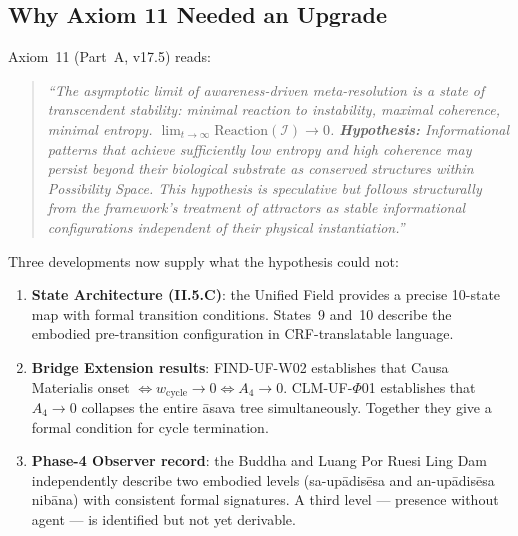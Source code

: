 \documentclass[12pt, a4paper]{article}
\providecommand{\wcyc}{w_{\mathrm{cycle}}}
\begin{document}
\subsection{Why Axiom 11 Needed an Upgrade}


Axiom~11 (Part~A, v17.5) reads:

\begin{quote}
\textit{``The asymptotic limit of awareness-driven meta-resolution
is a state of transcendent stability: minimal reaction to
instability, maximal coherence, minimal entropy.
$\lim_{t\to\infty}\mathrm{Reaction}(\mathcal{I})\to 0$.
\textbf{Hypothesis:} Informational patterns that achieve
sufficiently low entropy and high coherence may persist beyond
their biological substrate as conserved structures within
Possibility Space. This hypothesis is speculative but follows
structurally from the framework's treatment of attractors as
stable informational configurations independent of their physical
instantiation.''}
\end{quote}

Three developments now supply what the hypothesis could not:

\begin{enumerate}[leftmargin=*, itemsep=2pt]
\item \textbf{State Architecture (II.5.C)}: the Unified Field
  provides a precise 10-state map with formal transition
  conditions. States~9 and~10 describe the embodied
  pre-transition configuration in CRF-translatable language.

\item \textbf{Bridge Extension results}: FIND-UF-W02 establishes
  that Causa Materialis onset $\Leftrightarrow \wcyc \to 0
  \Leftrightarrow A_4 \to 0$. CLM-UF-$\Phi$01 establishes that
  $A_4\to 0$ collapses the entire \={a}sava tree simultaneously.
  Together they give a formal condition for cycle termination.

\item \textbf{Phase-4 Observer record}: the Buddha and Luang Por
  Ruesi Ling Dam independently describe two embodied levels
  (sa-up\={a}dis\={e}sa and an-up\={a}dis\={e}sa nib\={a}na)
  with consistent formal signatures. A third level --- presence
  without agent --- is identified but not yet derivable.
\end{enumerate}

\end{document}
